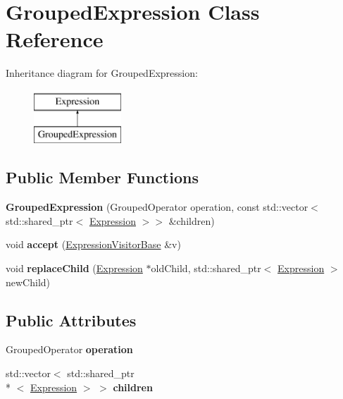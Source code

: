 \hypertarget{class_grouped_expression}{\section{Grouped\+Expression Class Reference}
\label{class_grouped_expression}
}
Inheritance diagram for Grouped\+Expression\+:\begin{figure}[H]
\begin{center}
\leavevmode
\includegraphics[height=2.000000cm]{class_grouped_expression}
\end{center}
\end{figure}
\subsection*{Public Member Functions}
\begin{DoxyCompactItemize}
\item 
\hypertarget{class_grouped_expression_a986d27a72d99ad866ad0d24241795a80}{{\bfseries Grouped\+Expression} (Grouped\+Operator operation, const std\+::vector$<$ std\+::shared\+\_\+ptr$<$ \hyperlink{class_expression}{Expression} $>$$>$ \&children)}\label{class_grouped_expression_a986d27a72d99ad866ad0d24241795a80}

\item 
\hypertarget{class_grouped_expression_a67963e289263b9c2cbf03edad83401b7}{void {\bfseries accept} (\hyperlink{class_expression_visitor_base}{Expression\+Visitor\+Base} \&v)}\label{class_grouped_expression_a67963e289263b9c2cbf03edad83401b7}

\item 
\hypertarget{class_grouped_expression_af1cb9044417df12361b6335962b3bc6c}{void {\bfseries replace\+Child} (\hyperlink{class_expression}{Expression} $\ast$old\+Child, std\+::shared\+\_\+ptr$<$ \hyperlink{class_expression}{Expression} $>$ new\+Child)}\label{class_grouped_expression_af1cb9044417df12361b6335962b3bc6c}

\end{DoxyCompactItemize}
\subsection*{Public Attributes}
\begin{DoxyCompactItemize}
\item 
\hypertarget{class_grouped_expression_a018f4f129a3b9b0be45c8ed10ff21813}{Grouped\+Operator {\bfseries operation}}\label{class_grouped_expression_a018f4f129a3b9b0be45c8ed10ff21813}

\item 
\hypertarget{class_grouped_expression_aabace43c5af51a0e913ff9033b71295c}{std\+::vector$<$ std\+::shared\+\_\+ptr\\*
$<$ \hyperlink{class_expression}{Expression} $>$ $>$ {\bfseries children}}\label{class_grouped_expression_aabace43c5af51a0e913ff9033b71295c}

\end{DoxyCompactItemize}
